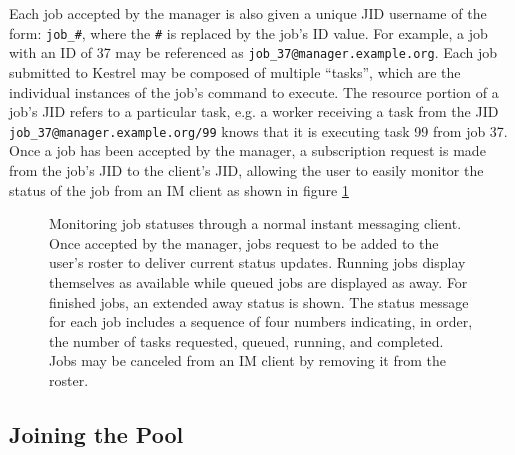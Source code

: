 Each job accepted by the manager is also given a unique JID username
of the form: \texttt{job\_\#}, where the \texttt{\#} is replaced by
the job's ID value. For example, a job with an ID of 37 may be referenced
as \texttt{job\_37@manager.example.org}. Each job submitted to Kestrel
may be composed of multiple {}``tasks'', which are the individual
instances of the job's command to execute. The resource portion of
a job's JID refers to a particular task, e.g. a worker receiving a
task from the JID \texttt{job\_37@manager.example.org/99} knows that
it is executing task 99 from job 37. Once a job has been accepted
by the manager, a subscription request is made from the job's JID
to the client's JID, allowing the user to easily monitor the status
of the job from an IM client as shown in figure \ref{fig:IM-Client}

%
\begin{figure}

\caption{\label{fig:IM-Client} Monitoring job statuses through a normal instant
messaging client. Once accepted by the manager, jobs request to be
added to the user's roster to deliver current status updates. Running
jobs display themselves as available while queued jobs are displayed
as away. For finished jobs, an extended away status is shown. The
status message for each job includes a sequence of four numbers indicating,
in order, the number of tasks requested, queued, running, and completed.
Jobs may be canceled from an IM client by removing it from the roster.}

\end{figure}



\subsection{Joining the Pool}

